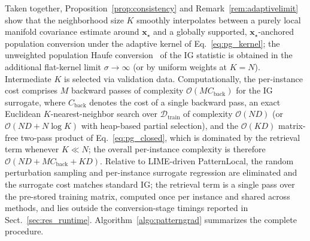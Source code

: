 \documentclass[pdflatex,sn-mathphys-num]{sn-jnl}
\theoremstyle{thmstyleone}
\theoremstyle{thmstyletwo}%
\theoremstyle{thmstylethree}%
\begin{document}
Taken together, Proposition~\ref{prop:consistency} and Remark~\ref{rem:adaptivelimit} show that the neighborhood size $K$ smoothly interpolates between a purely local manifold covariance estimate around $\mathbf{x}_\star$ and a globally supported, $\mathbf{x}_\star$-anchored population conversion under the adaptive kernel of Eq.~\eqref{eq:pg_kernel}; the unweighted population Haufe conversion~\cite{haufe2014} of the IG statistic is obtained in the additional flat-kernel limit $\sigma \to \infty$ (or by uniform weights at $K = N$). Intermediate $K$ is selected via validation data. Computationally, the per-instance cost comprises $M$ backward passes of complexity $\mathcal{O}(M C_{\text{back}})$ for the IG surrogate, where $C_{\text{back}}$ denotes the cost of a single backward pass, an exact Euclidean $K$-nearest-neighbor search over $\mathcal{D}_{\text{train}}$ of complexity $\mathcal{O}(ND)$ (or $\mathcal{O}(ND + N \log K)$ with heap-based partial selection), and the $\mathcal{O}(KD)$ matrix-free two-pass product of Eq.~\eqref{eq:pg_closed}, which is dominated by the retrieval term whenever $K \ll N$; the overall per-instance complexity is therefore $\mathcal{O}(ND + M C_{\text{back}} + KD)$. Relative to LIME-driven PatternLocal, the random perturbation sampling and per-instance surrogate regression are eliminated and the surrogate cost matches standard IG; the retrieval term is a single pass over the pre-stored training matrix, computed once per instance and shared across methods, and lies outside the conversion-stage timings reported in Sect.~\ref{sec:res_runtime}. Algorithm~\ref{algo:patterngrad} summarizes the complete procedure.
\end{document}
